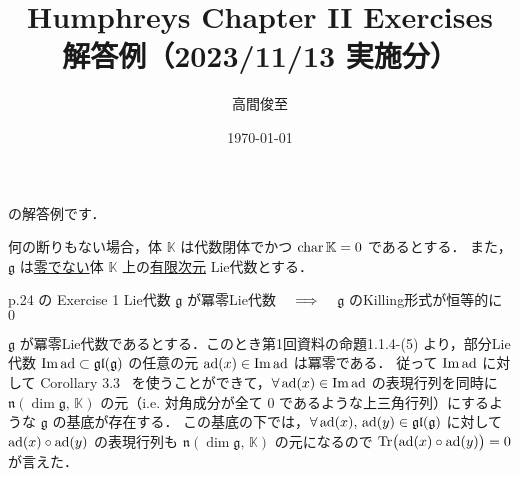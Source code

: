 \documentclass{ltjsarticle}
\makeatletter
\theoremstyle{mystyle} %
\renewcommand{\proofname}{証明}
\renewenvironment{proof}[1][\proofname]{\par
    \pushQED{\qed}%
    \normalfont \topsep6\p@\@plus6\p@\relax
    \trivlist
    \item[\hskip\labelsep
        \itshape
    \textbf{\underline{#1}}]\ignorespaces
}{%
    \popQED\endtrivlist\@endpefalse
}
\numberwithin{equation}{section}
\makeatother
\begin{document}
\title{Humphreys Chapter II Exercises \\ 解答例（2023/11/13 実施分）}
\author{高間俊至}
\date{\today}
\maketitle

\setcounter{section}{5}

\cite[p.24, Exercise1, 2]{Humphreys1972introduction}
の解答例です．

何の断りもない場合，体 $\mathbb{K}$ は代数閉体でかつ $\operatorname{char} \mathbb{K} = 0$ であるとする．
また，$\mathfrak{g}$ は\underline{零でない}体 $\mathbb{K}$ 上の\underline{有限次元} Lie代数とする．

\begin{myproblem}[label=ex:2-2-1]{p.24 の Exercise 1}
    Lie代数 $\mathfrak{g}$ が冪零Lie代数 $\quad \Longrightarrow \quad$ $\mathfrak{g}$ のKilling形式が恒等的に $0$
\end{myproblem}

\begin{proof}
    $\mathfrak{g}$ が冪零Lie代数であるとする．このとき第1回資料の命題1.1.4-(5) より，部分Lie代数 $\Im \operatorname{ad} \subset \mathfrak{gl} (\mathfrak{g})$ の任意の元 $\operatorname{ad}(x) \in \Im \operatorname{ad}$ は冪零である．
    従って $\Im \operatorname{ad}$ に対して Corollary 3.3~\cite[p.13]{Humphreys1972introduction} を使うことができて，$\forall \operatorname{ad}(x) \in \Im \operatorname{ad}$ の表現行列を同時に $\mathfrak{n}(\dim \mathfrak{g},\, \mathbb{K})$ の元（i.e. 対角成分が全て $0$ であるような上三角行列）にするような $\mathfrak{g}$ の基底が存在する．
    この基底の下では，$\forall \operatorname{ad}(x),\, \operatorname{ad}(y) \in \mathfrak{gl}(\mathfrak{g})$ に対して $\operatorname{ad}(x) \circ \operatorname{ad}(y)$ の表現行列も $\mathfrak{n}(\dim \mathfrak{g},\, \mathbb{K})$ の元になるので $\Tr \bigl( \operatorname{ad}(x) \circ \operatorname{ad}(y) \bigr) = 0$ が言えた．

\end{proof}
\end{document}
